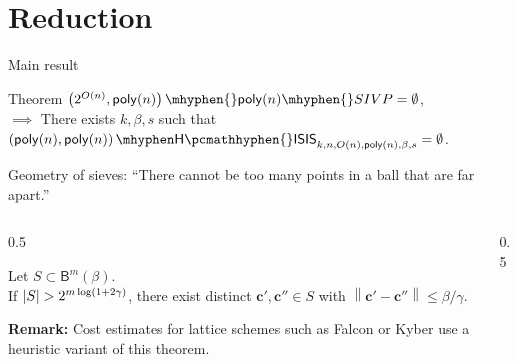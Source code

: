 \documentclass[xcolor=table,10pt,aspectratio=169]{beamer}
\renewcommand{\vec}[1]{\ensuremath{\mathbf{#1}}\xspace}
\newcommand{\norm}[1]{\left\lVert#1\right\rVert}
\newcommand{\HISIS}{\ensuremath{\mathsf{H\pcmathhyphen{}ISIS}}\xspace}
\newcommand{\ball}[2]{\ensuremath{\mathsf{B}^{#1}{(#2)}}}
\begin{document}
\section{Reduction}
\label{sec:org790b055}
\begin{frame}[label={sec:org1f617dd}]{Main result}
\begin{block}{Theorem}
\(\left(2^{O(n)}, \poly[n]\right)\mhyphen {}\poly[n]\mhyphen {}SIVP = \emptyset\),\\
\(\implies\) There exists \(k,\beta,s\) such that \(\left(\poly[n], \poly[n]\right)\mhyphen\HISIS_{k,n,O(n),\poly[n],\beta,s} = \emptyset\).
\end{block}
\end{frame}
\begin{frame}[label={sec:org4377ae1}]{Geometry of sieves: ``There cannot be too many points in a ball that are far apart.''}
\begin{columns}
\begin{column}{0.5\columnwidth}
\begin{lemma}[]
Let \(S \subset \ball{m}{\beta}\). \\

If \(\left\lvert S\right\rvert > 2^{m\log(1+2\gamma)}\), there exist distinct \(\vec{c}', \vec{c}'' \in S\) with \(\norm{\vec{c}' - \vec{c}''} \leq \beta/\gamma\).
\label{lem:simple-point-bound}
\end{lemma}

\textbf{Remark:} Cost estimates for lattice schemes such as Falcon or Kyber use a heuristic variant of this theorem.
\end{column}
\begin{column}{0.5\columnwidth}
\centering
{}
\end{column}
\end{columns}
\end{frame}
\end{document}
